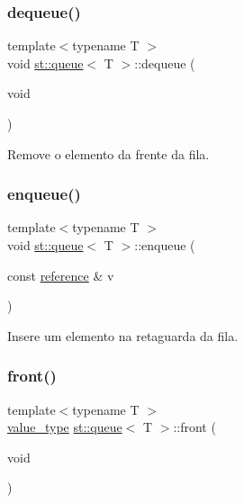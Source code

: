 \subsubsection{\texorpdfstring{dequeue()}{dequeue()}}
{\footnotesize\ttfamily template$<$typename T $>$ \\
void \hyperlink{classst_1_1queue}{st\+::queue}$<$ T $>$\+::dequeue (\begin{DoxyParamCaption}\item[{void}]{ }\end{DoxyParamCaption})\hspace{0.3cm}{\ttfamily [inline]}}



Remove o elemento da frente da fila. 

\mbox{\label{classst_1_1queue_aa2c66e1680b02c2046f3c9ce5c9b9615}} 
\subsubsection{\texorpdfstring{enqueue()}{enqueue()}}
{\footnotesize\ttfamily template$<$typename T $>$ \\
void \hyperlink{classst_1_1queue}{st\+::queue}$<$ T $>$\+::enqueue (\begin{DoxyParamCaption}\item[{const \hyperlink{classst_1_1queue_a826b47eddf0309ac74beca2f3d1e7b1c}{reference} \&}]{v }\end{DoxyParamCaption})\hspace{0.3cm}{\ttfamily [inline]}}



Insere um elemento na retaguarda da fila. 

\mbox{\label{classst_1_1queue_a3d01a0be47bf5d5a8c011423cf36baf6}} 
\subsubsection{\texorpdfstring{front()}{front()}}
{\footnotesize\ttfamily template$<$typename T $>$ \\
\hyperlink{classst_1_1queue_a2a0fa1d9b72bfdad9acf67a92146b143}{value\+\_\+type} \hyperlink{classst_1_1queue}{st\+::queue}$<$ T $>$\+::front (\begin{DoxyParamCaption}\item[{void}]{ }\end{DoxyParamCaption})\hspace{0.3cm}{\ttfamily [inline]}}



